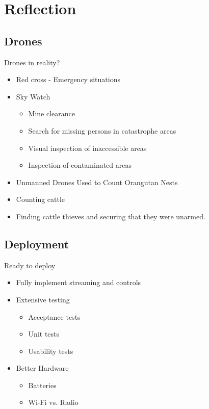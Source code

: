 \section{Reflection}
\subsection{Drones}
\begin{frame}{Drones in reality?}
\begin{itemize}
	\item Red cross - Emergency situations
	\item Sky Watch
	\begin{itemize}
		\item Mine clearance
		\item Search for missing persons in catastrophe areas
		\item Visual inspection of inaccessible areas
		\item Inspection of contaminated areas
	\end{itemize}
	\item Unmanned Drones Used to Count Orangutan Nests
	\item Counting cattle
	\item Finding cattle thieves and securing that they were unarmed.
\end{itemize}
\end{frame}

\subsection{Deployment}
\begin{frame}{Ready to deploy}
\begin{itemize}
	\item Fully implement streaming and controls
	\item Extensive testing
	\begin{itemize}
		\item Acceptance tests
		\item Unit tests
		\item Usability tests
	\end{itemize}
	\item Better Hardware
	\begin{itemize}
		\item Batteries
		\item Wi-Fi vs. Radio
	\end{itemize}
\end{itemize}
\end{frame}

